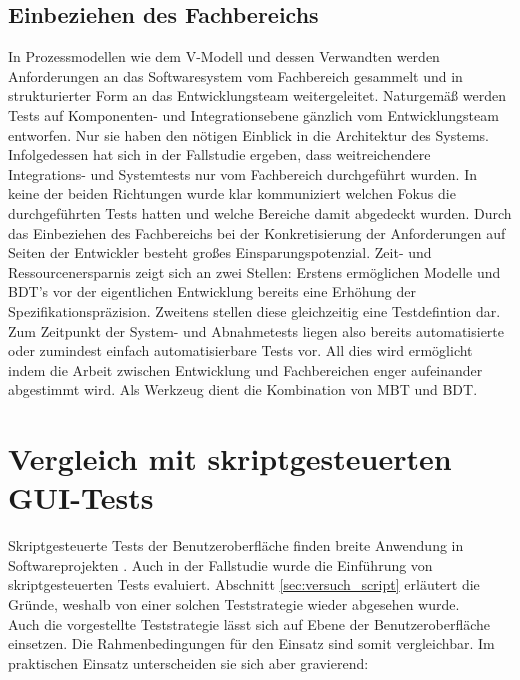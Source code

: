 \subsection{Einbeziehen des Fachbereichs}
In Prozessmodellen wie dem V-Modell und dessen Verwandten \cite{hohn_v-modell_2008} werden Anforderungen an das Softwaresystem vom Fachbereich gesammelt und in strukturierter Form an das Entwicklungsteam weitergeleitet. Naturgemäß werden Tests auf Komponenten- und Integrationsebene gänzlich vom Entwicklungsteam entworfen. Nur sie haben den nötigen Einblick in die Architektur des Systems. Infolgedessen hat sich in der Fallstudie ergeben, dass weitreichendere Integrations- und Systemtests nur vom Fachbereich durchgeführt wurden. In keine der beiden Richtungen wurde klar kommuniziert welchen Fokus die durchgeführten Tests hatten und welche Bereiche damit abgedeckt wurden. Durch das Einbeziehen des Fachbereichs bei der Konkretisierung der Anforderungen auf Seiten der Entwickler besteht großes Einsparungspotenzial. Zeit- und Ressourcenersparnis zeigt sich an zwei Stellen: Erstens ermöglichen Modelle und \Gls{BDT}'s vor der eigentlichen Entwicklung bereits eine Erhöhung der Spezifikationspräzision. Zweitens stellen diese gleichzeitig eine Testdefintion dar. Zum Zeitpunkt der System- und Abnahmetests liegen also bereits automatisierte oder zumindest einfach automatisierbare Tests vor. All dies wird ermöglicht indem die Arbeit zwischen Entwicklung und Fachbereichen enger aufeinander abgestimmt wird. Als Werkzeug dient die Kombination von \Gls{MBT} und \Gls{BDT}.

\section{Vergleich mit skriptgesteuerten GUI-Tests}
Skriptgesteuerte Tests der Benutzeroberfläche finden breite Anwendung in Softwareprojekten \cite{graham_experiences_2012}. Auch in der Fallstudie wurde die Einführung von skriptgesteuerten Tests evaluiert. Abschnitt \ref{sec:versuch_script} erläutert die Gründe, weshalb von einer solchen Teststrategie wieder abgesehen wurde.\\
Auch die vorgestellte Teststrategie lässt sich auf Ebene der Benutzeroberfläche einsetzen. Die Rahmenbedingungen für den Einsatz sind somit vergleichbar. Im praktischen Einsatz unterscheiden sie sich aber gravierend:


